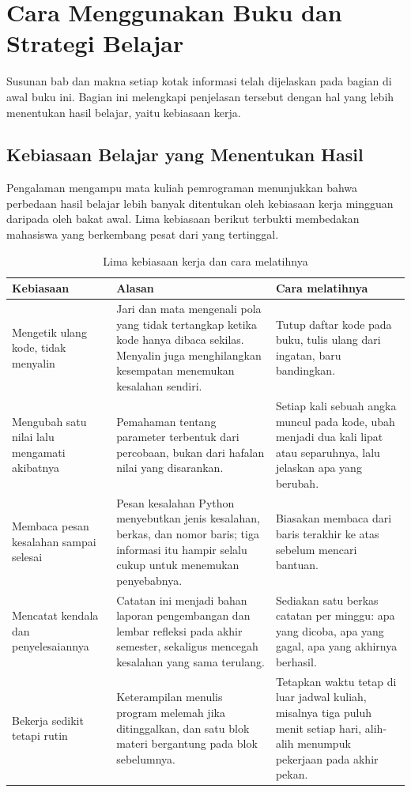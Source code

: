 \section{Cara Menggunakan Buku dan Strategi Belajar}
\label{sec:cara-belajar}

Susunan bab dan makna setiap kotak informasi telah dijelaskan pada bagian
 di awal buku ini. Bagian ini melengkapi
penjelasan tersebut dengan hal yang lebih menentukan hasil belajar, yaitu
kebiasaan kerja.

\subsection{Kebiasaan Belajar yang Menentukan Hasil}

Pengalaman mengampu mata kuliah pemrograman menunjukkan bahwa perbedaan hasil
belajar lebih banyak ditentukan oleh kebiasaan kerja mingguan daripada oleh
bakat awal. Lima kebiasaan berikut terbukti membedakan mahasiswa yang
berkembang pesat dari yang tertinggal.

\begin{table}[htbp]
\centering
\caption{Lima kebiasaan kerja dan cara melatihnya}
\label{tab:kebiasaan}
{\setlength{\tabcolsep}{4pt}\footnotesize%
\begin{tabularx}{\textwidth}{@{}L{3.6cm} L{4.5cm} Y@{}}
\toprule
\headrow \textbf{Kebiasaan} & \textbf{Alasan} & \textbf{Cara melatihnya} \\
\midrule
Mengetik ulang kode, tidak menyalin &
Jari dan mata mengenali pola yang tidak tertangkap ketika kode hanya dibaca
sekilas. Menyalin juga menghilangkan kesempatan menemukan kesalahan sendiri. &
Tutup daftar kode pada buku, tulis ulang dari ingatan, baru bandingkan. \\
\addlinespace
Mengubah satu nilai lalu mengamati akibatnya &
Pemahaman tentang parameter terbentuk dari percobaan, bukan dari hafalan nilai
yang disarankan. &
Setiap kali sebuah angka muncul pada kode, ubah menjadi dua kali lipat atau
separuhnya, lalu jelaskan apa yang berubah. \\
\addlinespace
Membaca pesan kesalahan sampai selesai &
Pesan kesalahan Python menyebutkan jenis kesalahan, berkas, dan nomor baris;
tiga informasi itu hampir selalu cukup untuk menemukan penyebabnya. &
Biasakan membaca dari baris terakhir ke atas sebelum mencari bantuan. \\
\addlinespace
Mencatat kendala dan penyelesaiannya &
Catatan ini menjadi bahan laporan pengembangan dan lembar refleksi pada akhir
semester, sekaligus mencegah kesalahan yang sama terulang. &
Sediakan satu berkas catatan per minggu: apa yang dicoba, apa yang gagal, apa
yang akhirnya berhasil. \\
\addlinespace
Bekerja sedikit tetapi rutin &
Keterampilan menulis program melemah jika ditinggalkan, dan satu blok materi
bergantung pada blok sebelumnya. &
Tetapkan waktu tetap di luar jadwal kuliah, misalnya tiga puluh menit setiap
hari, alih-alih menumpuk pekerjaan pada akhir pekan. \\
\bottomrule
\end{tabularx}}
\end{table}

